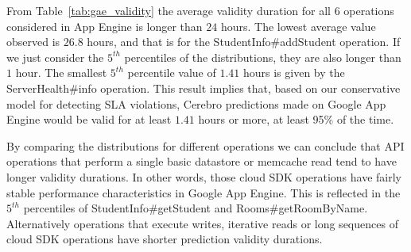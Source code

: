 


From Table~\ref{tab:gae_validity} 
the average validity duration for all 6 operations considered in App Engine is
longer than $24$ hours. The lowest average value observed is $26.8$ hours, 
and that is for the StudentInfo\#addStudent operation. If we
just consider the $5^{th}$ percentiles of the distributions, they are 
also longer than $1$ hour. The smallest $5^{th}$ percentile value of 
$1.41$ hours is 
given by the ServerHealth\#info operation. This result implies that, based on
our conservative model for detecting SLA violations,
Cerebro predictions made on Google App Engine would be valid for at least
$1.41$ hours or more, at least 95\% of the time.

By comparing the distributions for different operations we can conclude that
API operations that perform a single basic datastore or memcache read tend to
have longer validity durations. In other words, those cloud SDK operations have
fairly stable performance characteristics in Google App Engine. 
This is reflected in
the $5^{th}$ percentiles of StudentInfo\#getStudent and Rooms\#getRoomByName. 
Alternatively
operations that execute writes, iterative reads or long sequences of cloud SDK
operations have shorter prediction validity durations.

